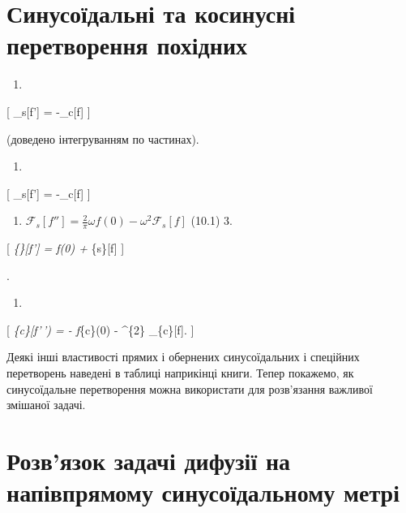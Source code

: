 \documentclass[
  ukrainian,
]{article}
\providecommand{\tightlist}{%
  \setlength{\itemsep}{0pt}\setlength{\parskip}{0pt}}
\begin{document}
\section{Синусоїдальні та косинусні перетворення
похідних}\label{ux441ux438ux43dux443ux441ux43eux457ux434ux430ux43bux44cux43dux456-ux442ux430-ux43aux43eux441ux438ux43dux443ux441ux43dux456-ux43fux435ux440ux435ux442ux432ux43eux440ux435ux43dux43dux44f-ux43fux43eux445ux456ux434ux43dux438ux445}

\begin{enumerate}
\def\labelenumi{\arabic{enumi}.}
\tightlist
\item
\end{enumerate}

{[} \_s{[}f'{]} = -\omega {}\_c{[}f{]} {]}

(доведено інтегруванням по частинах).

\begin{enumerate}
\def\labelenumi{\arabic{enumi}.}
\tightlist
\item
\end{enumerate}

{[} \_s{[}f'{]} = -\omega {}\_c{[}f{]} {]}

\begin{enumerate}
\def\labelenumi{\arabic{enumi}.}
\setcounter{enumi}{1}
\tightlist
\item
  \(\mathcal{F}_s[f''] = \frac{2}{\pi} \omega f(0) - \omega^2 \mathcal{F}_s[f]\)
  (10.1) 3.
\end{enumerate}

{[} \emph{\{\rho\}{[}f'{]} =  f(0) +
\omega {}}\{s\}{[}f{]} {]}

.

\begin{enumerate}
\def\labelenumi{\arabic{enumi}.}
\setcounter{enumi}{3}
\tightlist
\item
\end{enumerate}

{[} \emph{\{c\}{[}f'\,') = - f}\{c\}(0) -
\omega\^{}\{2\} \_\{c\}{[}f{]}. {]}

Деякі інші властивості прямих і обернених синусоїдальних і спеційних
перетворень наведені в таблиці наприкінці книги. Тепер покажемо, як
синусоїдальне перетворення можна використати для розв'язання важливої
змішаної задачі.

\section{Розв'язок задачі дифузії на напівпрямому синусоїдальному
метрі}\label{ux440ux43eux437ux432ux44fux437ux43eux43a-ux437ux430ux434ux430ux447ux456-ux434ux438ux444ux443ux437ux456ux457-ux43dux430-ux43dux430ux43fux456ux432ux43fux440ux44fux43cux43eux43cux443-ux441ux438ux43dux443ux441ux43eux457ux434ux430ux43bux44cux43dux43eux43cux443-ux43cux435ux442ux440ux456}
\end{document}
